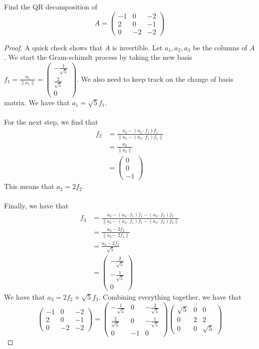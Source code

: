 \documentclass[a4paper]{article}
\begin{document}
\begin{eg}{}{} Find the QR decomposition of $$A=\begin{pmatrix}
-1 & 0 & -2\\
2 & 0 & -1\\
0 & -2 & -2
\end{pmatrix}$$ \tcbline
\begin{proof}
A quick check shows that $A$ is invertible. Let $a_1,a_2,a_3$ be the columns of $A$. We start the Gram-schimdt process by taking the new basis $f_1=\frac{a_1}{\|a_1\|}=\begin{pmatrix}-\frac{1}{\sqrt{5}}\\ \frac{2}{\sqrt{5}}\\ 0\end{pmatrix}$. We also need to keep track on the change of basis matrix. We have that $a_1=\sqrt{5}f_1$. \\~\\
For the next step, we find that 
\begin{align*}
f_2&=\frac{a_2-(a_2\cdot f_1)f_1}{\|a_2-(a_2\cdot f_1)f_1\|}\\
&=\frac{a_2}{\|a_2\|}\\
&=\begin{pmatrix} 0\\ 0\\ -1\end{pmatrix}
\end{align*}
This means that $a_2=2f_2$. \\~\\
Finally, we have that 
\begin{align*}
f_3&=\frac{a_3-(a_3\cdot f_1)f_1-(a_3\cdot f_2)f_2}{\|a_3-(a_3\cdot f_1)f_1-(a_3\cdot f_2)f_2\|}\\
&=\frac{a_3-2f_2}{\|a_3-2f_2\|}\\
&=\frac{a_3-2f_2}{\sqrt{5}}\\
&=\begin{pmatrix}-\frac{2}{\sqrt{5}}\\ -\frac{1}{\sqrt{5}}\\ 0\end{pmatrix}
\end{align*}
We have that $a_3=2f_2+\sqrt{5}f_3$. Combining everything together, we have that $$\begin{pmatrix}
-1 & 0 & -2\\
2 & 0 & -1\\
0 & -2 & -2
\end{pmatrix}=\begin{pmatrix}
-\frac{1}{\sqrt{5}} & 0 & -\frac{2}{\sqrt{5}}\\
\frac{2}{\sqrt{5}} & 0 & -\frac{1}{\sqrt{5}}\\
0 & -1 & 0
\end{pmatrix}\begin{pmatrix}
\sqrt{5} & 0 & 0\\
0 & 2 & 2\\
0 & 0 & \sqrt{5}
\end{pmatrix}$$
\end{proof}
\end{eg}
\end{document}
